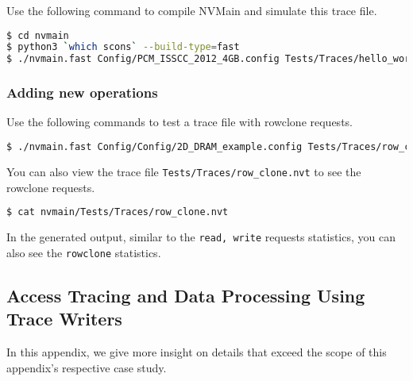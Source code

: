 Use the following command to compile NVMain and simulate this trace file. 
\begin{lstlisting}[language=bash]
$ cd nvmain
$ python3 `which scons` --build-type=fast
$ ./nvmain.fast Config/PCM_ISSCC_2012_4GB.config Tests/Traces/hello_world.nvt 1000000
\end{lstlisting}

\subsubsection*{Adding new operations}
\label{app:tudr:adding_ops}
Use the following commands to test a trace file with rowclone requests.
\begin{lstlisting}[language=bash]
$ ./nvmain.fast Config/Config/2D_DRAM_example.config Tests/Traces/row_clone.nvt 1000
\end{lstlisting}
You can also view the trace file \texttt{Tests/Traces/row\_clone.nvt} to see the rowclone requests.  

\begin{lstlisting}[language=bash]
$ cat nvmain/Tests/Traces/row_clone.nvt
\end{lstlisting}

In the generated output, similar to the \texttt{read, write} requests statistics, you can also see the \texttt{rowclone} statistics. 

\subsection*{Access Tracing and Data Processing Using Trace Writers}
\label{app:tudo}
In this appendix, we give more insight on details that exceed the scope of this appendix's respective case study.

